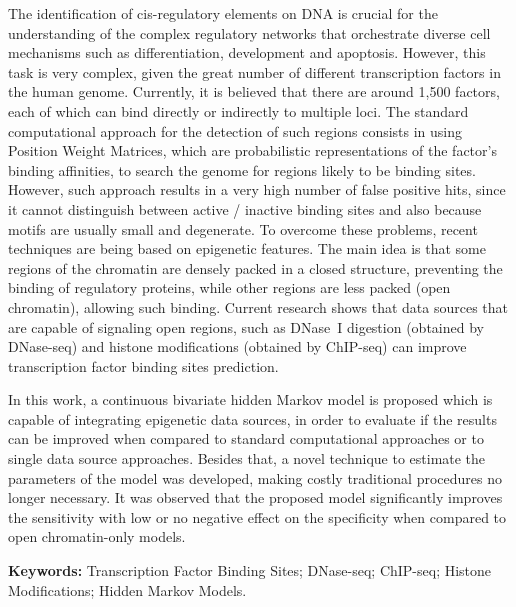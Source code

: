 

\begin{abstracts}

The identification of cis-regulatory elements on DNA is crucial for the understanding of the complex regulatory networks that orchestrate diverse cell mechanisms such as differentiation, development and apoptosis. However, this task is very complex, given the great number of different transcription factors in the human genome. Currently, it is believed that there are around 1,500 factors, each of which can bind directly or indirectly to multiple loci. The standard computational approach for the detection of such regions consists in using Position Weight Matrices, which are probabilistic representations of the factor's binding affinities, to search the genome for regions likely to be binding sites. However, such approach results in a very high number of false positive hits, since it cannot distinguish between active / inactive binding sites and also because motifs are usually small and degenerate. To overcome these problems, recent techniques are being based on epigenetic features. The main idea is that some regions of the chromatin are densely packed in a closed structure, preventing the binding of regulatory proteins, while other regions are less packed (open chromatin), allowing such binding. Current research shows that data sources that are capable of signaling open regions, such as DNase~I digestion (obtained by DNase-seq) and histone modifications (obtained by ChIP-seq) can improve transcription factor binding sites prediction.

In this work, a continuous bivariate hidden Markov model is proposed which is capable of integrating epigenetic data sources, in order to evaluate if the results can be improved when compared to standard computational approaches or to single data source approaches. Besides that, a novel technique to estimate the parameters of the model was developed, making costly traditional procedures no longer necessary. It was observed that the proposed model significantly improves the sensitivity with low or no negative effect on the specificity when compared to open chromatin-only models.

{\bf Keywords: } Transcription Factor Binding Sites; DNase-seq; ChIP-seq; Histone Modifications; Hidden Markov Models.

\end{abstracts}